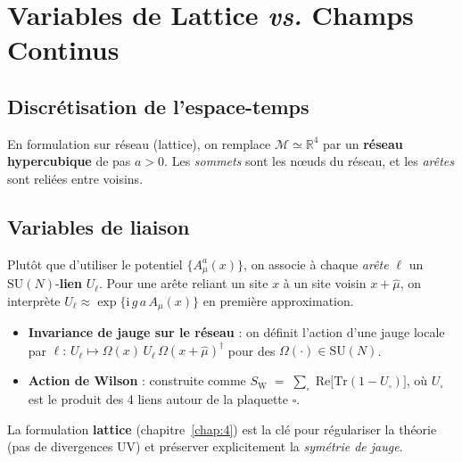 \section{Variables de Lattice \textit{vs.} Champs Continus}
\label{sec:3.3}

\subsection*{Discrétisation de l’espace-temps}
En formulation sur réseau (lattice), on remplace \(\mathcal{M}\simeq \mathbb{R}^4\) par un \textbf{réseau hypercubique} de pas \(a>0\). Les \emph{sommets} sont les nœuds du réseau, et les \emph{arêtes} sont reliées entre voisins.

\subsection*{Variables de liaison}
Plutôt que d’utiliser le potentiel \(\{A_\mu^a(x)\}\), on associe à chaque \emph{arête} \(\ell\) un \(\mathrm{SU}(N)\)-\textbf{lien} \(U_\ell\). Pour une arête reliant un site \(x\) à un site voisin \(x+\hat{\mu}\), on interprète \(U_\ell\approx\exp\!\bigl\{\mathrm{i}\,g\,a\,A_\mu(x)\bigr\}\) en première approximation.  
\begin{itemize}
	\item \textbf{Invariance de jauge sur le réseau} : on définit l’action d’une jauge locale par \(\ell:\,U_\ell \mapsto \Omega(x)\,U_\ell\,\Omega(x+\hat{\mu})^\dagger\) pour des \(\Omega(\cdot)\in \mathrm{SU}(N)\).
	\item \textbf{Action de Wilson} : construite comme \(\displaystyle S_{\mathrm{W}} \;=\; \sum_{\square}\; \mathrm{Re}\!\bigl[\mathrm{Tr}(1 - U_{\square})\bigr]\), où \(U_{\square}\) est le produit des 4 liens autour de la plaquette \(\square\).
\end{itemize}

La formulation \textbf{lattice} (chapitre~\ref{chap:4}) est la clé pour régulariser la théorie (pas de divergences UV) et préserver explicitement la \textit{symétrie de jauge}.

